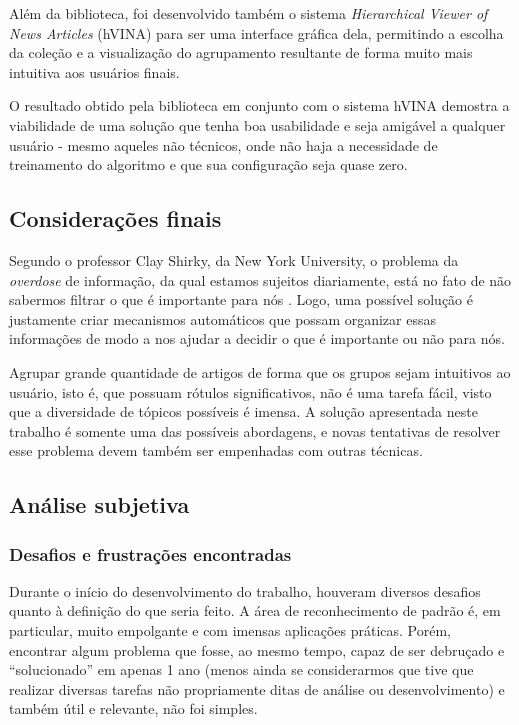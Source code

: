\documentclass[a4paper,12pt]{article}
\begin{document}
Além da biblioteca, foi desenvolvido também o sistema \textit{Hierarchical Viewer of News Articles} (hVINA) para ser uma interface gráfica dela, permitindo a escolha da coleção e a visualização do agrupamento resultante de forma muito mais intuitiva aos usuários finais.

O resultado obtido pela biblioteca em conjunto com o sistema hVINA demostra a viabilidade de uma solução que tenha boa usabilidade e seja amigável a qualquer usuário - mesmo aqueles não técnicos, onde não haja a necessidade de treinamento do algoritmo e que sua configuração seja quase zero.

\subsection {Considerações finais}
\label {sec:consideracoes_finais}

Segundo o professor Clay Shirky, da New York University, o problema da \textit{overdose} de informação, da qual estamos sujeitos diariamente, está no fato de não sabermos filtrar o que é importante para nós \cite{shirky}. Logo, uma possível solução é justamente criar mecanismos automáticos que possam organizar essas informações de modo a nos ajudar a decidir o que é importante ou não para nós.

Agrupar grande quantidade de artigos de forma que os grupos sejam intuitivos ao usuário, isto é, que possuam rótulos significativos, não é uma tarefa fácil, visto que a diversidade de tópicos possíveis é imensa. A solução apresentada neste trabalho é somente uma das possíveis abordagens, e novas tentativas de resolver esse problema devem também ser empenhadas com outras técnicas.

\subsection {Análise subjetiva}
\label {sec:analise_subjetiva}

\subsubsection {Desafios e frustrações encontradas}
\label {sec:desafios_frustracoes_encontradas}

Durante o início do desenvolvimento do trabalho, houveram diversos desafios quanto à definição do que seria feito. A área de reconhecimento de padrão é, em particular, muito empolgante e com imensas aplicações práticas. Porém, encontrar algum problema que fosse, ao mesmo tempo, capaz de ser debruçado e “solucionado” em apenas 1 ano (menos ainda se considerarmos que tive que realizar diversas tarefas não propriamente ditas de análise ou desenvolvimento) e também útil e relevante, não foi simples.
\end{document}
